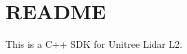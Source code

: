 \chapter{README}
\hypertarget{md_src_2unilidar__sdk2_2unitree__lidar__sdk_2README}{}\label{md_src_2unilidar__sdk2_2unitree__lidar__sdk_2README}
This is a C++ SDK for Unitree Lidar L2. 